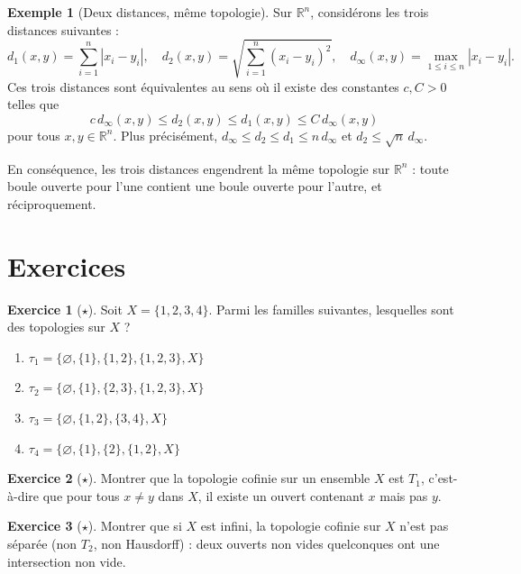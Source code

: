 \documentclass[12pt,a4paper,openany]{book}
\theoremstyle{definition}
\theoremstyle{cours}
\theoremstyle{coursnormal}
\newtheorem{exemple}[theoreme]{Exemple}
\newtheorem{exercice}{Exercice}[chapter]
\newcommand{\R}{\mathbb{R}}
\begin{document}
\begin{exemple}[Deux distances, même topologie]\label{ex:distances-meme-topo}
  Sur $\R^n$, considérons les trois distances suivantes :
  \[
    d_1(x,y) = \sum_{i=1}^n |x_i - y_i|, \quad
    d_2(x,y) = \sqrt{\sum_{i=1}^n (x_i - y_i)^2}, \quad
    d_\infty(x,y) = \max_{1 \leq i \leq n} |x_i - y_i|.
  \]
  Ces trois distances sont équivalentes au sens où il existe des constantes $c, C > 0$ telles que
  \[
    c \, d_\infty(x,y) \leq d_2(x,y) \leq d_1(x,y) \leq C \, d_\infty(x,y)
  \]
  pour tous $x, y \in \R^n$. Plus précisément, $d_\infty \leq d_2 \leq d_1 \leq n \, d_\infty$ et $d_2 \leq \sqrt{n}\, d_\infty$.

  En conséquence, les trois distances engendrent la même topologie sur $\R^n$ : toute boule ouverte pour l'une contient une boule ouverte pour l'autre, et réciproquement.
\end{exemple}

\section{Exercices}
\label{sec:exercices-chap1}

\begin{exercice}[$\star$]\label{exo:verif-topologie}
  Soit $X = \{1,2,3,4\}$. Parmi les familles suivantes, lesquelles sont des topologies sur $X$ ?
  \begin{enumerate}[label=(\alph*)]
    \item $\tau_1 = \{\varnothing, \{1\}, \{1,2\}, \{1,2,3\}, X\}$
    \item $\tau_2 = \{\varnothing, \{1\}, \{2,3\}, \{1,2,3\}, X\}$
    \item $\tau_3 = \{\varnothing, \{1,2\}, \{3,4\}, X\}$
    \item $\tau_4 = \{\varnothing, \{1\}, \{2\}, \{1,2\}, X\}$
  \end{enumerate}
\end{exercice}

\begin{exercice}[$\star$]\label{exo:cofinie-T1}
  Montrer que la topologie cofinie sur un ensemble $X$ est $T_1$, c'est-à-dire que pour tous $x \neq y$ dans $X$, il existe un ouvert contenant $x$ mais pas $y$.
\end{exercice}

\begin{exercice}[$\star$]\label{exo:cofinie-non-hausdorff}
  Montrer que si $X$ est infini, la topologie cofinie sur $X$ n'est pas séparée (non $T_2$, non Hausdorff) : deux ouverts non vides quelconques ont une intersection non vide.
\end{exercice}
\end{document}
